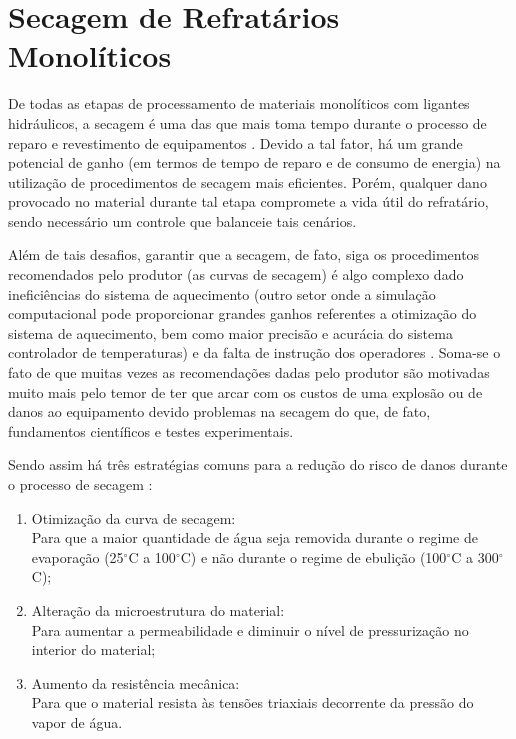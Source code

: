 \section{Secagem de Refratários Monolíticos}\label{secagem}
De todas as etapas de processamento de materiais monolíticos com ligantes
hidráulicos, a secagem é uma das que mais toma tempo durante o processo de
reparo e revestimento de equipamentos \cite{da2015refractory}. Devido a tal
fator, há um grande potencial de ganho (em termos de tempo de reparo e de
consumo de energia) na utilização de procedimentos de secagem mais eficientes.
Porém, qualquer dano provocado no material durante tal etapa compromete a vida
útil do refratário, sendo necessário um controle que balanceie tais cenários.

Além de tais desafios, garantir que a secagem, de fato, siga os procedimentos
recomendados pelo produtor (as curvas de secagem) é algo complexo dado
ineficiências do sistema de aquecimento (outro setor onde a simulação
computacional pode proporcionar grandes ganhos referentes a otimização do
sistema de aquecimento, bem como maior precisão e acurácia do sistema
controlador de temperaturas) e da falta de instrução dos operadores
\cite{da2015refractory}. Soma-se o fato de que muitas vezes as recomendações
dadas pelo produtor são motivadas muito mais pelo temor de ter que arcar com os
custos de uma explosão ou de danos ao equipamento devido problemas na secagem do
que, de fato, fundamentos científicos e testes experimentais.

Sendo assim há três estratégias comuns para a redução do risco de danos durante
o processo de secagem \cite{da2015refractory}:

\begin{enumerate}
\item Otimização da curva de secagem: \\ Para que a maior quantidade de água
  seja removida durante o regime de evaporação (25$^{\circ}$C a 100$^{\circ}$C)
  e não durante o regime de ebulição (100$^{\circ}$C a 300$^{\circ}$C);
\item Alteração da microestrutura do material: \\ Para aumentar a permeabilidade e
  diminuir o nível de pressurização no interior do material;
\item Aumento da resistência mecânica: \\ Para que o material resista às tensões
  triaxiais decorrente da pressão do vapor de água.
\end{enumerate}

